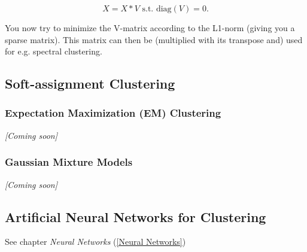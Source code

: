 \documentclass[../main.tex]{subfiles}
\begin{document}
        $$
        X = X*V\text{ s.t. diag}(V)=0.
        $$

        You now try to minimize the V-matrix according to the L1-norm (giving you a sparse matrix). This matrix can then be (multiplied with its transpose and) used for e.g. spectral clustering.

\subsection{Soft-assignment Clustering}

    \subsubsection{Expectation Maximization (EM) Clustering}
    \textit{[Coming soon]}

    \subsubsection{Gaussian Mixture Models}
    \textit{[Coming soon]}



\subsection{Artificial Neural Networks for Clustering}
    See chapter \textit{Neural Networks} (\ref{Neural Networks})
\end{document}
